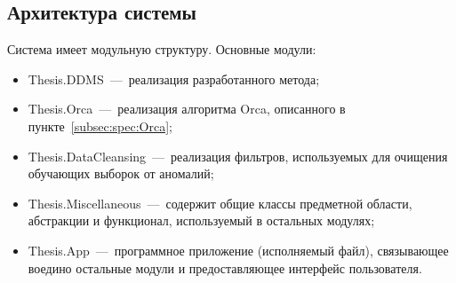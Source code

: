 \subsection{Архитектура системы}
Система имеет модульную структуру.
Основные модули:
\begin{itemize}
	\item Thesis.DDMS~---~реализация разработанного метода;
	\item Thesis.Orca~---~реализация алгоритма Orca, описанного в пункте~\ref{subsec:spec:Orca};
	\item Thesis.DataCleansing~---~реализация фильтров, используемых для очищения обучающих выборок от аномалий;
	\item Thesis.Miscellaneous~---~содержит общие классы предметной области, абстракции и функционал, используемый в остальных модулях;
	\item Thesis.App~---~программное приложение (исполняемый файл), связывающее воедино остальные модули и предоставляющее интерфейс пользователя.
\end{itemize}

